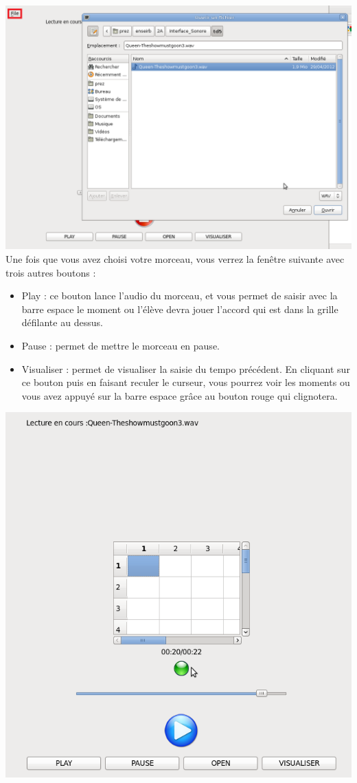\documentclass[a4paper]{article}
\begin{document}
\includegraphics[scale=0.5]{manulutil8.png}\\
Une fois que vous avez choisi votre morceau, vous verrez la fenêtre suivante avec trois autres boutons : 
\begin{itemize}
\item  Play : ce bouton lance l'audio du morceau, et vous permet de saisir avec la barre espace le moment ou l'élève devra jouer l'accord qui est dans la grille défilante au dessus.
\item  Pause : permet de mettre le morceau en pause.
\item  Visualiser : permet de visualiser la saisie du tempo précédent. En cliquant sur ce bouton puis en faisant reculer le curseur, vous pourrez voir les moments ou vous avez appuyé sur la barre espace grâce au bouton rouge qui clignotera.\\
\end{itemize}
\includegraphics[scale=0.5]{manulutil9.png}\\
\end{document}
